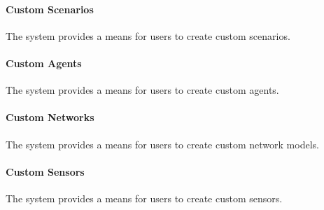 \documentclass[titlepage]{article}
\newcommand{\cbox}[0]{
    \CheckBox[height=5pt,width=5pt]{}
}
\begin{document}
\begin{Form}
    \paragraph{Custom Scenarios} The system provides a means for users to create custom scenarios.\cbox
    \paragraph{Custom Agents} The system provides a means for users to create custom agents.\cbox
    \paragraph{Custom Networks} The system provides a means for users to create custom network models.\cbox
    \paragraph{Custom Sensors} The system provides a means for users to create custom sensors.\cbox



\end{Form}
\end{document}
